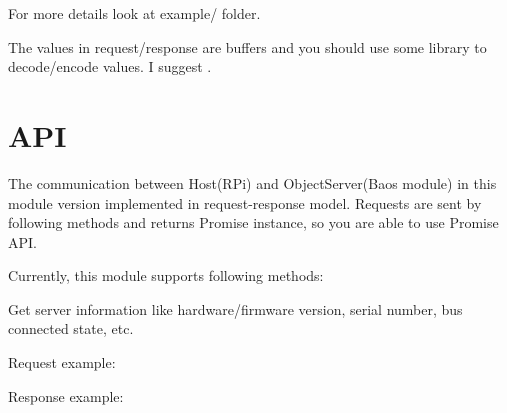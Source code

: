 \documentclass[letterpaper,10pt,english]{sphinxmanual}
\begin{document}
For more details look at example/ folder.

The values in request/response are buffers and you should use some library to decode/encode values. I suggest .


\section{API}
\label{\detokenize{bobaos:api}}\label{\detokenize{bobaos:api}}
The communication between Host(RPi) and ObjectServer(Baos module) in this module version implemented in request-response model.
Requests are sent by following methods and returns Promise instance, so you are able to use Promise API.

Currently, this module supports following methods:


Get server information like hardware/firmware version, serial number, bus connected state, etc.

Request example:

%
\begin{sphinxVerbatim}[commandchars=\\\{\}]
   
    
     
    
     
\end{sphinxVerbatim}

Response example:
\end{document}
